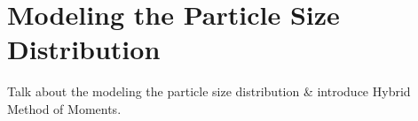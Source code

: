 \section{Modeling the Particle Size Distribution}
\label{sec:subfilter:ndf}

Talk about the modeling the particle size distribution \& introduce Hybrid Method of Moments.
